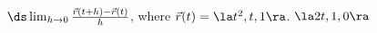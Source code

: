{$\ds \lim_{h\to 0} \frac{\vec r(t+h)-\vec r(t)}{h}$, where 
$\vec r(t) = \la t^2,t,1\ra$.
}
{
$\la2t,1,0\ra$
}

